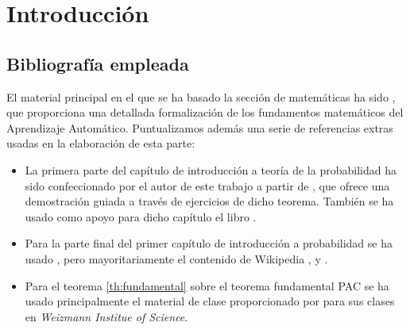 \chapter*{Introducción}

  \section*{Bibliografía empleada}
  El material principal en el que se ha basado la sección de matemáticas ha sido \citeauthor{shalev}, 
  que proporciona una detallada formalización de los fundamentos matemáticos del Aprendizaje Automático. Puntualizamos además
  una serie de referencias extras usadas en la elaboración de esta parte:
  
  \begin{itemize} 
   \item La primera parte del capítulo de introducción a teoría de la probabilidad ha sido confeccionado por el autor de 
   este trabajo a partir de \citet{caratheodory}, que ofrece una demostración guiada a través de ejercicios de dicho teorema. 
   También se ha usado como apoyo para dicho capítulo el libro \citeauthor{loeve}. 
   \item Para la parte final del primer capítulo de introducción a probabilidad se ha usado \citeauthor{shalev}, pero
   mayoritariamente el contenido de Wikipedia \cite{wiki:markov}, \cite{wiki:hoeff_lemma} y \cite{wiki:hoeffding}.
   \item Para el teorema \ref{th:fundamental} sobre el teorema fundamental PAC se ha usado principalmente el material de clase
   proporcionado por \citeauthor{slfetaya} para sus clases en \textit{Weizmann Institue of Science}.
  \end{itemize}
   
   